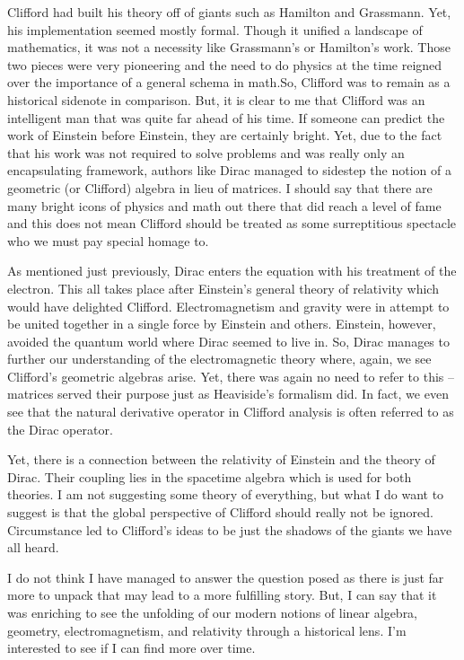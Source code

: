 \documentclass[12pt]{article}
\begin{document}
Clifford had built his theory off of giants such as Hamilton and Grassmann. Yet, his implementation seemed mostly formal. Though it unified a landscape of mathematics, it was not a necessity like Grassmann's or Hamilton's work. Those two pieces were very pioneering and the need to do physics at the time reigned over the importance of a general schema in math.So, Clifford was to remain as a historical sidenote in comparison. But, it is clear to me that Clifford was an intelligent man that was quite far ahead of his time. If someone can predict the work of Einstein before Einstein, they are certainly bright. Yet, due to the fact that his work was not required to solve problems and was really only an encapsulating framework, authors like Dirac managed to sidestep the notion of a geometric (or Clifford) algebra in lieu of matrices. I should say that there are many bright icons of physics and math out there that did reach a level of fame and this does not mean Clifford should be treated as some surreptitious spectacle who we must pay special homage to.

As mentioned just previously, Dirac enters the equation with his treatment of the electron. This all takes place after Einstein's general theory of relativity which would have delighted Clifford. Electromagnetism and gravity were in attempt to be united together in a single force by Einstein and others. Einstein, however, avoided the quantum world where Dirac seemed to live in. So, Dirac manages to further our understanding of the electromagnetic theory where, again, we see Clifford's geometric algebras arise. Yet, there was again no need to refer to this -- matrices served their purpose just as Heaviside's formalism did. In fact, we even see that the natural derivative operator in Clifford analysis is often referred to as the Dirac operator.

Yet, there is a connection between the relativity of Einstein and the theory of Dirac. Their coupling lies in the spacetime algebra which is used for both theories. I am not suggesting some theory of everything, but what I do want to suggest is that the global perspective of Clifford should really not be ignored. Circumstance led to Clifford's ideas to be just the shadows of the giants we have all heard. 

I do not think I have managed to answer the question posed as there is just far more to unpack that may lead to a more fulfilling story. But, I can say that it was enriching to see the unfolding of our modern notions of linear algebra, geometry, electromagnetism, and relativity through a historical lens. I'm interested to see if I can find more over time. 
\end{document}
